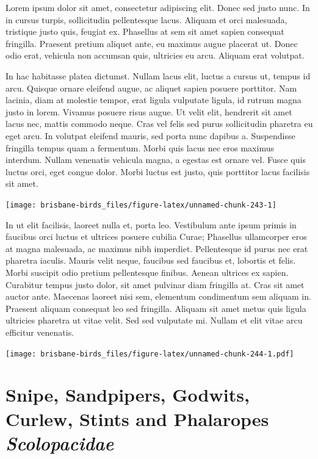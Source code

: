 \documentclass[]{book}
\let\origfigure\figure
\let\endorigfigure\endfigure
\renewenvironment{figure}[1][2] {
  \expandafter\origfigure\expandafter[H]
} {
  \endorigfigure
}
\begin{document}
Lorem ipsum dolor sit amet, consectetur adipiscing elit. Donec sed justo
nunc. In in cursus turpis, sollicitudin pellentesque lacus. Aliquam et
orci malesuada, tristique justo quis, feugiat ex. Phasellus at sem sit
amet sapien consequat fringilla. Praesent pretium aliquet ante, eu
maximus augue placerat ut. Donec odio erat, vehicula non accumsan quis,
ultricies eu arcu. Aliquam erat volutpat.

In hac habitasse platea dictumst. Nullam lacus elit, luctus a cursus ut,
tempus id arcu. Quisque ornare eleifend augue, ac aliquet sapien posuere
porttitor. Nam lacinia, diam at molestie tempor, erat ligula vulputate
ligula, id rutrum magna justo in lorem. Vivamus posuere risus augue. Ut
velit elit, hendrerit sit amet lacus nec, mattis commodo neque. Cras vel
felis sed purus sollicitudin pharetra eu eget arcu. In volutpat eleifend
mauris, sed porta nunc dapibus a. Suspendisse fringilla tempus quam a
fermentum. Morbi quis lacus nec eros maximus interdum. Nullam venenatis
vehicula magna, a egestas est ornare vel. Fusce quis luctus orci, eget
congue dolor. Morbi luctus est justo, quis porttitor lacus facilisis sit
amet.

\begin{figure}
\texttt{[image: brisbane-birds\_files/figure-latex/unnamed-chunk-243-1]} \caption{insert figure caption}\label{fig:unnamed-chunk-243}
\end{figure}

In ut elit facilisis, laoreet nulla et, porta leo. Vestibulum ante ipsum
primis in faucibus orci luctus et ultrices posuere cubilia Curae;
Phasellus ullamcorper eros at magna malesuada, ac maximus nibh
imperdiet. Pellentesque id purus nec erat pharetra iaculis. Mauris velit
neque, faucibus sed faucibus et, lobortis et felis. Morbi suscipit odio
pretium pellentesque finibus. Aenean ultrices ex sapien. Curabitur
tempus justo dolor, sit amet pulvinar diam fringilla at. Cras sit amet
auctor ante. Maecenas laoreet nisi sem, elementum condimentum sem
aliquam in. Praesent aliquam consequat leo sed fringilla. Aliquam sit
amet metus quis ligula ultricies pharetra ut vitae velit. Sed sed
vulputate mi. Nullam et elit vitae arcu efficitur venenatis.

\begin{figure}
\centering
\texttt{[image: brisbane-birds\_files/figure-latex/unnamed-chunk-244-1.pdf]}
\caption{\label{fig:unnamed-chunk-244}insert figure caption}
\end{figure}

\chapter{\texorpdfstring{Snipe, Sandpipers, Godwits, Curlew, Stints and
Phalaropes
\emph{Scolopacidae}}{Snipe, Sandpipers, Godwits, Curlew, Stints and Phalaropes Scolopacidae}}\label{snipe-sandpipers-godwits-curlew-stints-and-phalaropes-scolopacidae}
\end{document}
